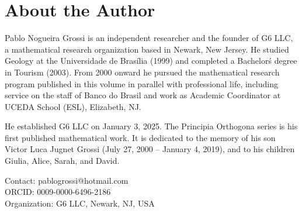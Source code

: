 \documentclass[12pt, oneside]{book}
\theoremstyle{plain}
\theoremstyle{definition}
\theoremstyle{remark}
\begin{document}
\backmatter

\chapter*{About the Author}

Pablo Nogueira Grossi is an independent researcher and the founder of G6 LLC,
a mathematical research organization based in Newark, New Jersey. He studied
Geology at the Universidade de Bras\'ilia (1999) and completed a Bachelor\'s
degree in Tourism (2003). From 2000 onward he pursued the mathematical research
program published in this volume in parallel with professional life, including
service on the staff of Banco do Brasil and work as Academic Coordinator at
UCEDA School (ESL), Elizabeth, NJ.

He established G6 LLC on January 3, 2025. The Principia Orthogona series is
his first published mathematical work. It is dedicated to the memory of his
son Victor Luca Jugnet Grossi (July 27, 2000 -- January 4, 2019), and to his
children Giulia, Alice, Sarah, and David.

\bigskip
\noindent Contact: pablogrossi@hotmail.com\\
ORCID: 0009-0000-6496-2186\\
Organization: G6 LLC, Newark, NJ, USA
\end{document}
